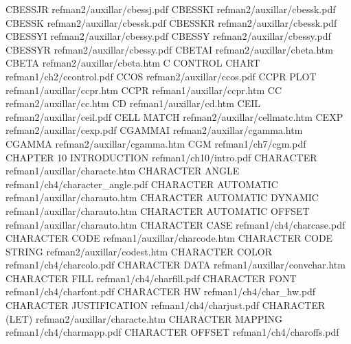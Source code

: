 CBESSJR                                 refman2/auxillar/cbessj.pdf
CBESSKI                                 refman2/auxillar/cbessk.pdf
CBESSK                                  refman2/auxillar/cbessk.pdf
CBESSKR                                 refman2/auxillar/cbessk.pdf
CBESSYI                                 refman2/auxillar/cbessy.pdf
CBESSY                                  refman2/auxillar/cbessy.pdf
CBESSYR                                 refman2/auxillar/cbessy.pdf
CBETAI                                  refman2/auxillar/cbeta.htm
CBETA                                   refman2/auxillar/cbeta.htm
C CONTROL CHART                         refman1/ch2/ccontrol.pdf
CCOS                                    refman2/auxillar/ccos.pdf
CCPR PLOT                               refman1/auxillar/ccpr.htm
CCPR                                    refman1/auxillar/ccpr.htm
CC                                      refman2/auxillar/cc.htm
CD                                      refman1/auxillar/cd.htm
CEIL                                    refman2/auxillar/ceil.pdf
CELL MATCH                              refman2/auxillar/cellmatc.htm
CEXP                                    refman2/auxillar/cexp.pdf
CGAMMAI                                 refman2/auxillar/cgamma.htm
CGAMMA                                  refman2/auxillar/cgamma.htm
CGM                                     refman1/ch7/cgm.pdf
CHAPTER 10 INTRODUCTION                 refman1/ch10/intro.pdf
CHARACTER                               refman1/auxillar/characte.htm
CHARACTER ANGLE                         refman1/ch4/character_angle.pdf
CHARACTER AUTOMATIC                     refman1/auxillar/charauto.htm
CHARACTER AUTOMATIC DYNAMIC             refman1/auxillar/charauto.htm
CHARACTER AUTOMATIC OFFSET              refman1/auxillar/charauto.htm
CHARACTER CASE                          refman1/ch4/charcase.pdf
CHARACTER CODE                          refman1/auxillar/charcode.htm
CHARACTER CODE STRING                   refman2/auxillar/codest.htm
CHARACTER COLOR                         refman1/ch4/charcolo.pdf
CHARACTER DATA                          refman1/auxillar/convchar.htm
CHARACTER FILL                          refman1/ch4/charfill.pdf
CHARACTER FONT                          refman1/ch4/charfont.pdf
CHARACTER HW                            refman1/ch4/char_hw.pdf
CHARACTER JUSTIFICATION                 refman1/ch4/charjust.pdf
CHARACTER (LET)                         refman2/auxillar/characte.htm
CHARACTER MAPPING                       refman1/ch4/charmapp.pdf
CHARACTER OFFSET                        refman1/ch4/charoffs.pdf
